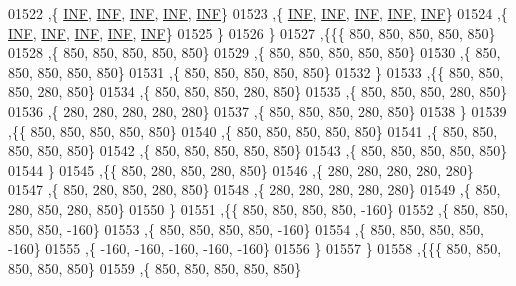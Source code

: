 \begin{DoxyCode}
01522    ,\{   \mbox{\hyperlink{energy__const_8h_a12c2040f25d8e3a7b9e1c2024c618cb6}{INF}},   \mbox{\hyperlink{energy__const_8h_a12c2040f25d8e3a7b9e1c2024c618cb6}{INF}},   \mbox{\hyperlink{energy__const_8h_a12c2040f25d8e3a7b9e1c2024c618cb6}{INF}},   \mbox{\hyperlink{energy__const_8h_a12c2040f25d8e3a7b9e1c2024c618cb6}{INF}},   \mbox{\hyperlink{energy__const_8h_a12c2040f25d8e3a7b9e1c2024c618cb6}{INF}}\}
01523    ,\{   \mbox{\hyperlink{energy__const_8h_a12c2040f25d8e3a7b9e1c2024c618cb6}{INF}},   \mbox{\hyperlink{energy__const_8h_a12c2040f25d8e3a7b9e1c2024c618cb6}{INF}},   \mbox{\hyperlink{energy__const_8h_a12c2040f25d8e3a7b9e1c2024c618cb6}{INF}},   \mbox{\hyperlink{energy__const_8h_a12c2040f25d8e3a7b9e1c2024c618cb6}{INF}},   \mbox{\hyperlink{energy__const_8h_a12c2040f25d8e3a7b9e1c2024c618cb6}{INF}}\}
01524    ,\{   \mbox{\hyperlink{energy__const_8h_a12c2040f25d8e3a7b9e1c2024c618cb6}{INF}},   \mbox{\hyperlink{energy__const_8h_a12c2040f25d8e3a7b9e1c2024c618cb6}{INF}},   \mbox{\hyperlink{energy__const_8h_a12c2040f25d8e3a7b9e1c2024c618cb6}{INF}},   \mbox{\hyperlink{energy__const_8h_a12c2040f25d8e3a7b9e1c2024c618cb6}{INF}},   \mbox{\hyperlink{energy__const_8h_a12c2040f25d8e3a7b9e1c2024c618cb6}{INF}}\}
01525    \}
01526   \}
01527  ,\{\{\{   850,   850,   850,   850,   850\}
01528    ,\{   850,   850,   850,   850,   850\}
01529    ,\{   850,   850,   850,   850,   850\}
01530    ,\{   850,   850,   850,   850,   850\}
01531    ,\{   850,   850,   850,   850,   850\}
01532    \}
01533   ,\{\{   850,   850,   850,   280,   850\}
01534    ,\{   850,   850,   850,   280,   850\}
01535    ,\{   850,   850,   850,   280,   850\}
01536    ,\{   280,   280,   280,   280,   280\}
01537    ,\{   850,   850,   850,   280,   850\}
01538    \}
01539   ,\{\{   850,   850,   850,   850,   850\}
01540    ,\{   850,   850,   850,   850,   850\}
01541    ,\{   850,   850,   850,   850,   850\}
01542    ,\{   850,   850,   850,   850,   850\}
01543    ,\{   850,   850,   850,   850,   850\}
01544    \}
01545   ,\{\{   850,   280,   850,   280,   850\}
01546    ,\{   280,   280,   280,   280,   280\}
01547    ,\{   850,   280,   850,   280,   850\}
01548    ,\{   280,   280,   280,   280,   280\}
01549    ,\{   850,   280,   850,   280,   850\}
01550    \}
01551   ,\{\{   850,   850,   850,   850,  -160\}
01552    ,\{   850,   850,   850,   850,  -160\}
01553    ,\{   850,   850,   850,   850,  -160\}
01554    ,\{   850,   850,   850,   850,  -160\}
01555    ,\{  -160,  -160,  -160,  -160,  -160\}
01556    \}
01557   \}
01558  ,\{\{\{   850,   850,   850,   850,   850\}
01559    ,\{   850,   850,   850,   850,   850\}

\end{DoxyCode}
